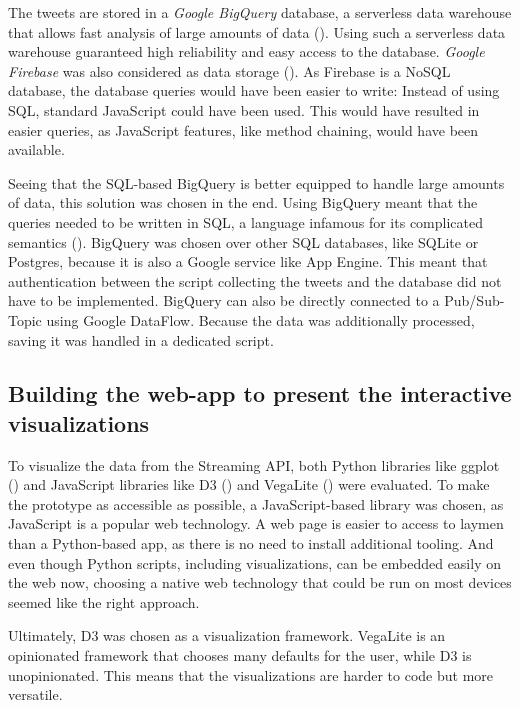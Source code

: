 The tweets are stored in a \emph{Google BigQuery} database, a serverless data warehouse that allows fast analysis of large amounts of data (\cite{googleBigQueryCloudData2020}). Using such a serverless data warehouse guaranteed high reliability and easy access to the database. \emph{Google Firebase} was also considered as data storage (\cite{googleCloudFirestoreFirebase2020}). As Firebase is a NoSQL database, the database queries would have been easier to write: Instead of using SQL, standard JavaScript could have been used. This would have resulted in easier queries, as JavaScript features, like method chaining, would have been available.

Seeing that the SQL-based BigQuery is better equipped to handle large amounts of data, this solution was chosen in the end. Using BigQuery meant that the queries needed to be written in SQL, a language infamous for its complicated semantics (\cite{slutz1998massive}). BigQuery was chosen over other SQL databases, like SQLite or Postgres, because it is also a Google service like App Engine. This meant that authentication between the script collecting the tweets and the database did not have to be implemented. BigQuery can also be directly connected to a Pub/Sub-Topic using Google DataFlow. Because the data was additionally processed, saving it was handled in a dedicated script. 

\subsection{Building the web-app to present the interactive visualizations}
To visualize the data from the Streaming API, both Python libraries like ggplot (\cite{wickhamGgplot2ElegantGraphics2016}) and JavaScript libraries like D3 (\cite{bostockD3JsDataDriven}) and VegaLite (\cite{uwidlVegaLiteHighLevelGrammar}) were evaluated. To make the prototype as accessible as possible, a JavaScript-based library was chosen, as JavaScript is a popular web technology. A web page is easier to access to laymen than a Python-based app, as there is no need to install additional tooling. And even though Python scripts, including visualizations, can be embedded easily on the web now, choosing a native web technology that could be run on most devices seemed like the right approach.

Ultimately, D3 was chosen as a visualization framework. VegaLite is an opinionated framework that chooses many defaults for the user, while D3 is unopinionated. This means that the visualizations are harder to code but more versatile.

